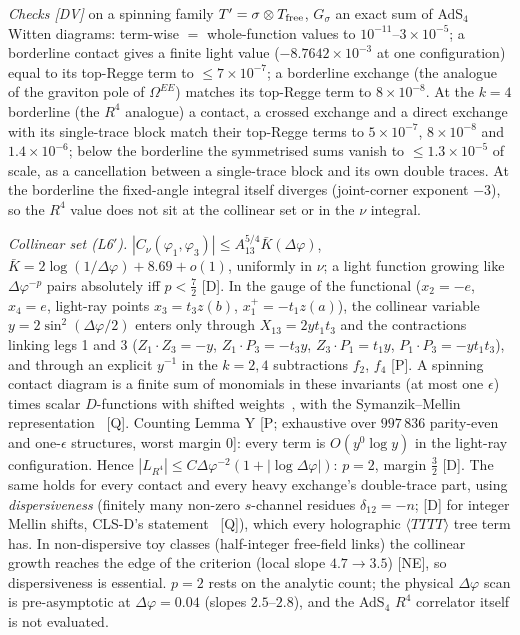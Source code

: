\documentclass[aps,prl,onecolumn,superscriptaddress,nofootinbib]{revtex4-2}
\begin{document}
\emph{Checks [DV]} on a spinning family $T'=\sigma\otimes T_{\rm free}$, $G_\sigma$ an exact sum of
AdS$_4$ Witten diagrams: term-wise $=$ whole-function values to $10^{-11}$--$3\times10^{-5}$; a
borderline contact gives a finite light value ($-8.7642\times10^{-3}$ at one configuration)
equal to its top-Regge term to $\le7\times10^{-7}$; a borderline exchange (the analogue of the
graviton pole of $\Omega^{EE}$) matches its top-Regge term to $8\times10^{-8}$. At the $k=4$ borderline
(the $R^4$ analogue) a contact, a crossed exchange and a direct exchange with its single-trace block match
their top-Regge terms to $5\times10^{-7}$, $8\times10^{-8}$ and $1.4\times10^{-6}$; below the borderline
the symmetrised sums vanish to $\le1.3\times10^{-5}$ of scale, as a cancellation between a single-trace
block and its own double traces. At the borderline the fixed-angle integral itself diverges
(joint-corner exponent $-3$), so the $R^4$ value does not sit at the collinear set or in the $\nu$
integral.

\emph{Collinear set (L6$'$).} $|C_\nu(\varphi_1,\varphi_3)|\le A_{13}^{5/4}\bar K(\Delta\varphi)$,
$\bar K=2\log(1/\Delta\varphi)+8.69+o(1)$, uniformly in $\nu$; a light function growing like
$\Delta\varphi^{-p}$ pairs absolutely iff $p<\tfrac72$ [D]. In the gauge of the functional
($x_2=-e$, $x_4=e$, light-ray points $x_3=t_3z(b)$, $x_1^+=-t_1z(a)$), the collinear variable
$y=2\sin^2(\Delta\varphi/2)$ enters only through $X_{13}=2yt_1t_3$ and the contractions linking legs 1 and 3
($Z_1\cdot Z_3=-y$, $Z_1\cdot P_3=-t_3y$, $Z_3\cdot P_1=t_1y$, $P_1\cdot P_3=-yt_1t_3$), and through an explicit
$y^{-1}$ in the $k=2,4$ subtractions $f_2$, $f_4$ [P]. A spinning contact diagram is a finite sum of
monomials in these invariants (at most one $\epsilon$) times scalar $D$-functions with shifted
weights~\cite{Paulos,CGPspin}, with the Symanzik--Mellin representation~\cite{PenedonesMellin} [Q].
Counting Lemma Y [P; exhaustive over $997\,836$ parity-even and one-$\epsilon$ structures, worst margin 0]:
every term is $O(y^0\log y)$ in the light-ray configuration. Hence
$|L_{R^4}|\le C\Delta\varphi^{-2}(1+|\log\Delta\varphi|)$: $p=2$, margin $\tfrac32$ [D]. The same holds for
every contact and every heavy exchange's double-trace part, using \emph{dispersiveness} (finitely many
non-zero $s$-channel residues $\delta_{12}=-n$; [D] for integer Mellin shifts, CLS-D's statement~\cite{CLSD}
[Q]), which every holographic $\langle TTTT\rangle$ tree term has. In non-dispersive toy classes
(half-integer free-field links) the collinear growth reaches the edge of the criterion (local slope $4.7\to3.5$)
[NE], so dispersiveness is essential. $p=2$ rests on the analytic count; the physical $\Delta\varphi$ scan is pre-asymptotic at $\Delta\varphi=0.04$ (slopes $2.5$--$2.8$), and the AdS$_4$ $R^4$ correlator itself is not evaluated.
\end{document}
